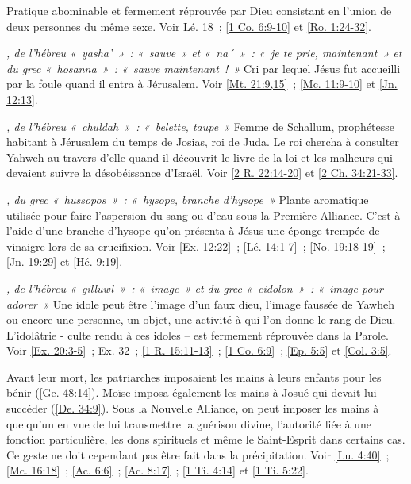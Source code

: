 \begin{multicols}{2}
\textit{}\newline
Pratique abominable et fermement réprouvée par Dieu consistant en l'union de deux personnes du même sexe. Voir Lé. 18~; \vref{1 Co. 6:9-10} et \vref{Ro. 1:24-32}.

\textit{, de l'hébreu «~yasha'~»~: «~sauve~» et «~na´~»~: «~je te prie, maintenant~» et du grec «~hosanna~»~: «~sauve maintenant~!~»}\newline
Cri par lequel Jésus fut accueilli par la foule quand il entra à Jérusalem.\newline
Voir \vref{Mt. 21:9,15}~; \vref{Mc. 11:9-10} et \vref{Jn. 12:13}.

\textit{, de l'hébreu «~chuldah~»~: «~belette, taupe~»}\newline
Femme de Schallum, prophétesse habitant à Jérusalem du temps de Josias, roi de Juda. Le roi chercha à consulter Yahweh au travers d'elle quand il découvrit le livre de la loi et les malheurs qui devaient suivre la désobéissance d'Israël.\newline
Voir \vref{2 R. 22:14-20} et \vref{2 Ch. 34:21-33}.

\textit{, du grec «~hussopos~»~: «~hysope, branche d'hysope~»}\newline
Plante aromatique utilisée pour faire l'aspersion du sang ou d'eau sous la Première Alliance. C'est à l'aide d'une branche d'hysope qu'on présenta à Jésus une éponge trempée de vinaigre lors de sa crucifixion.\newline
Voir \vref{Ex. 12:22}~; \vref{Lé. 14:1-7}~; \vref{No. 19:18-19}~; \vref{Jn. 19:29} et \vref{Hé. 9:19}.

\textit{, de l'hébreu «~gilluwl~»~: «~image~» et du grec «~eidolon~»~: «~image pour adorer~»}\newline
Une idole peut être l'image d'un faux dieu, l'image faussée de Yawheh ou encore une personne, un objet, une activité à qui l'on donne le rang de Dieu. L'idolâtrie - culte rendu à ces idoles – est fermement réprouvée dans la Parole. Voir \vref{Ex. 20:3-5}~; Ex. 32~; \vref{1 R. 15:11-13}~; \vref{1 Co. 6:9}~; \vref{Ep. 5:5} et \vref{Col. 3:5}.

\textit{}\newline
Avant leur mort, les patriarches imposaient les mains à leurs enfants pour les bénir (\vref{Ge. 48:14}). Moïse imposa également les mains à Josué qui devait lui succéder (\vref{De. 34:9}). Sous la Nouvelle Alliance, on peut imposer les mains à quelqu'un en vue de lui transmettre la guérison divine, l'autorité liée à une fonction particulière, les dons spirituels et même le Saint-Esprit dans certains cas. Ce geste ne doit cependant pas être fait dans la précipitation.\newline
Voir \vref{Lu. 4:40}~; \vref{Mc. 16:18}~; \vref{Ac. 6:6}~; \vref{Ac. 8:17}~; \vref{1 Ti. 4:14} et \vref{1 Ti. 5:22}.


\end{multicols}
